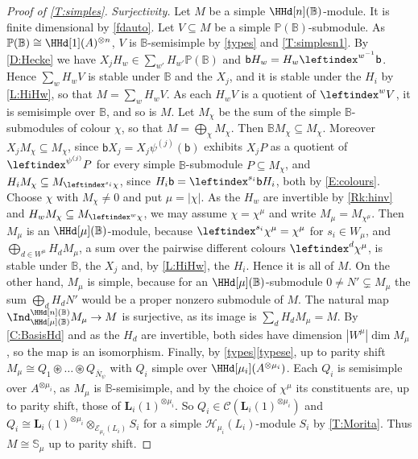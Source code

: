 \documentclass[a4paper,11pt]{amsart}
\numberwithin{equation}{subsection}
\theoremstyle{definition}
\theoremstyle{theorem}
\theoremstyle{remark}
\newcommand\Sym{W}
\newcommand\bb{\mathsf{b}}
\newcommand\Po{\mathbb{P}(\mathbb{B})}
\newcommand{\Bo}{\mathbb{B}}
\newcommand{\So}{\mathbb{S}}
\begin{document}
\begin{proof}[Proof of \autoref{T:simples}]
  \emph{Surjectivity.} Let $M$ be a simple $\HHd[n](\Bo)$-module. It is finite
  dimensional by \autoref{fdauto}. Let $V\subseteq M$ be a simple
  $\Po$-submodule. As $\Po\cong\HHd[1](A)^{\otimes n}$, $V$ is
  $\Bo$-semisimple by \autoref{types} and \autoref{T:simplesn1}. By
  \autoref{D:Hecke} we have $X_jH_w\in\sum_{w'}H_{w'}\Po$ and
  $\bb H_w=H_w\leftindex^{w^{-1}}\bb$. Hence $\sum_{w}H_wV$ is stable under $\Bo$ and the $X_j$, and it is stable
  under the $H_i$ by \autoref{L:HiHw}, so that $M=\sum_{w}H_wV$. As each
  $H_wV$ is a quotient of $\leftindex^{w}{V}$, it is semisimple over $\Bo$, and so is $M$. Let
  $M_\chi$ be the sum of the simple $\Bo$-submodules of colour $\chi$, so
  that $M=\bigoplus_{\chi}M_\chi$. Then $\Bo M_\chi\subseteq M_\chi$.
  Moreover $X_jM_\chi\subseteq M_\chi$, since $\bb X_j=X_j\psi^{(j)}(\bb)$
  exhibits $X_jP$ as a quotient of
  $\leftindex^{\psi^{(j)}}P$ for every
  simple $\Bo$-submodule $P\subseteq M_\chi$, and
  $H_iM_\chi\subseteq M_{\leftindex^{s_i}\chi}$, since
  $H_i\bb=\leftindex^{s_i}\bb H_i$, both by \autoref{E:colours}. Choose
  $\chi$ with $M_\chi\ne0$ and put $\mu=|\chi|$. As the $H_w$ are
  invertible by \autoref{Rk:hinv} and
  $H_wM_\chi\subseteq M_{\leftindex^{w}\chi}$, we may assume
  $\chi=\chi^\mu$ and write $M_\mu=M_{\chi^\mu}$. Then $M_\mu$ is an
  $\HHd[\mu](\Bo)$-module, because $\leftindex^{s_i}\chi^\mu=\chi^\mu$
  for $s_i\in\Sym_\mu$, and $\bigoplus_{d\in\Sym^{\mu}}H_dM_\mu$,
  a sum over the pairwise different colours $\leftindex^{d}\chi^\mu$, is stable
  under $\Bo$, the $X_j$ and, by \autoref{L:HiHw}, the $H_i$. Hence it is
  all of $M$. On the other hand, $M_\mu$ is simple, because for an
  $\HHd[\mu](\Bo)$-submodule $0\ne N'\subsetneq M_\mu$ the sum
  $\bigoplus_dH_dN'$ would be a proper nonzero submodule of $M$. The natural map $\Ind_{\HHd[\mu](\Bo)}^{\HHd[n](\Bo)}M_\mu\to M$ is surjective, as its image is $\sum_dH_dM_\mu=M$. By \autoref{C:BasisHd} and as the $H_d$ are invertible, both sides have dimension $|\Sym^\mu|\dim M_\mu$, so the map is an isomorphism. Finally, by \autoref{types}\autoref{typese}, up to parity shift
  $M_\mu\cong Q_1\circledast\dots\circledast Q_{\bar N_\psi}$ with $Q_i$ simple
  over $\HHd[\mu_i](A^{\otimes\mu_i})$. Each $Q_i$ is semisimple over $A^{\otimes\mu_i}$, as $M_\mu$ is $\Bo$-semisimple, and by the
  choice of $\chi^\mu$ its constituents are,
  up to parity shift, those of $\mathbf L_i(1)^{\otimes\mu_i}$. So
  $Q_i\in\mathcal C(\mathbf L_i(1)^{\otimes\mu_i})$ and
  $Q_i\cong\mathbf L_i(1)^{\otimes\mu_i}\otimes_{\mathcal E_{\mu_i}(L_i)}S_i$
  for a simple $\mathcal H_{\mu_i}(L_i)$-module $S_i$ by
  \autoref{T:Morita}. Thus $M\cong\So_\mu$ up to parity shift.
\end{proof}
\end{document}
